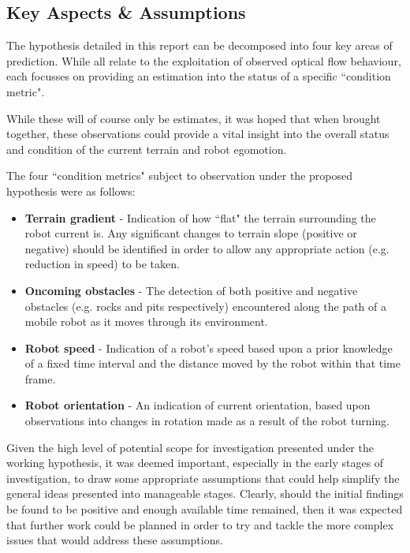 \subsection{Key Aspects \& Assumptions}
\label{assumptions}

The hypothesis detailed in this report can be decomposed into four key areas of prediction. While all relate to the exploitation of observed optical flow behaviour, each focusses on providing an estimation into the status of a specific ``condition metric". 

While these will of course only be estimates, it was hoped that when brought together, these observations could provide a vital insight into the overall status and condition of the current terrain and robot egomotion. 

The four ``condition metrics" subject to observation under the proposed hypothesis were as follows:

\begin{itemize}
	\item \textbf{Terrain gradient} - Indication of how ``flat" the terrain surrounding the robot current is. Any significant changes to terrain slope (positive or negative) should be identified in order to allow any appropriate action (e.g. reduction in speed) to be taken.
	\item  \textbf{Oncoming obstacles} - The detection of both positive and negative obstacles (e.g. rocks and pits respectively) encountered along the path of a mobile robot as it moves through its environment. 
	\item \textbf{Robot speed} - Indication of a robot's speed based upon a prior knowledge of a fixed time interval and the distance moved by the robot within that time frame.
	\item \textbf{Robot orientation} - An indication of current orientation, based upon observations into changes in rotation made as a result of the robot turning. 
	
\end{itemize} 

Given the high level of potential scope for investigation presented under the working hypothesis, it was deemed important, especially in the early stages of investigation, to draw some appropriate assumptions that could help simplify the general ideas presented into manageable stages. Clearly, should the initial findings be found to be positive and enough available time remained, then it was expected that further work could be planned in order to try and tackle the more complex issues that would address these assumptions.


